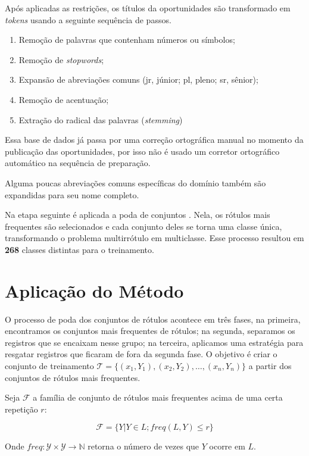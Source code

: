 \documentclass[runningheads,a4paper]{llncs}
\begin{document}
Após aplicadas as restrições, os títulos da oportunidades são transformado em \textit{tokens} usando a seguinte sequência de passos.

\begin{enumerate}
	\item Remoção de palavras que contenham números ou símbolos;
	\item Remoção de \textit{stopwords};
	\item Expansão de abreviações comuns (jr, júnior; pl, pleno; sr, sênior);
	\item Remoção de acentuação;
	\item Extração do radical das palavras (\textit{stemming})
\end{enumerate}

Essa base de dados já passa por uma correção ortográfica manual no momento da publicação das oportunidades, por isso não é usado um corretor ortográfico automático na sequência de preparação.

Alguma poucas abreviações comuns específicas do domínio também são expandidas para seu nome completo.

Na etapa seguinte é aplicada a poda de conjuntos \cite{Read2008-bt}. Nela, os rótulos mais frequentes são selecionados e cada conjunto deles se torna uma classe única, transformando o problema multirrótulo em multiclasse. Esse processo resultou em \textbf{268} classes distintas para o treinamento.

\section{Aplicação do Método} \label{sec:aplicacao}

O processo de poda dos conjuntos de rótulos acontece em três fases, na primeira, encontramos os conjuntos mais frequentes de rótulos; na segunda, separamos os registros que se encaixam nesse grupo; na terceira, aplicamos uma estratégia para resgatar registros que ficaram de fora da segunda fase. O objetivo é criar o conjunto de treinamento $\mathcal{T} = \{(x_1,Y_1), (x_2, Y_2), \dots, (x_n, Y_n)\}$ a partir dos conjuntos de rótulos mais frequentes.

Seja $\mathcal{F}$ a família de conjunto de rótulos mais frequentes acima de uma certa repetição $r$:

$$
\mathcal{F} = \{Y | Y \in L; freq(L, Y) \leq r\}
$$

Onde $freq : \mathcal{Y} \times \mathcal{Y} \to \mathbb{N}$ retorna o número de vezes que $Y$ ocorre em $L$.
\end{document}
